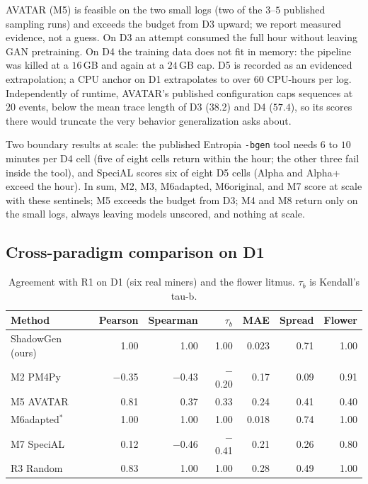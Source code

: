 \documentclass[runningheads]{llncs}
\newcommand{\chg}[1]{\textcolor{chgblue}{#1}}
\begin{document}
\chg{AVATAR (M5) is feasible on the two small logs (two of the $3$--$5$ published sampling runs) and exceeds the budget from D3 upward; we report measured evidence, not a guess. On D3 an attempt consumed the full hour without leaving GAN pretraining. On D4 the training data does not fit in memory: the pipeline was killed at a $16$\,GB and again at a $24$\,GB cap. D5 is recorded as an evidenced extrapolation; a CPU anchor on D1 extrapolates to over $60$ CPU-hours per log. Independently of runtime, AVATAR's published configuration caps sequences at $20$ events, below the mean trace length of D3 ($38.2$) and D4 ($57.4$), so its scores there would truncate the very behavior generalization asks about.}

\chg{Two boundary results at scale: the published Entropia \texttt{-bgen} tool needs $6$ to $10$ minutes per D4 cell (five of eight cells return within the hour; the other three fail inside the tool), and SpeciAL scores six of eight D5 cells (Alpha and Alpha+ exceed the hour). In sum, M2, M3, M6adapted, M6original, and M7 score at scale with these sentinels; M5 exceeds the budget from D3; M4 and M8 return only on the small logs, always leaving models unscored, and nothing at scale.}

\subsection{Cross-paradigm comparison on D1}
\label{sec:eval:external}


\begin{table}[t]
\centering
\caption{Agreement with R1 on D1 (six real miners) and the flower litmus. $\tau_b$ is Kendall's tau-b.}
\label{tab:corr}
\setlength{\tabcolsep}{4.5pt}
\footnotesize
\begin{tabular}{@{}lrrrrrr@{}}
\toprule
Method & Pearson & Spearman & $\tau_b$ & MAE & Spread & Flower \\
\midrule
\chg{ShadowGen (ours)}  & 1.00 & 1.00 & 1.00 & 0.023 & 0.71 & 1.00 \\
M2 PM4Py         & $-$0.35 & $-$0.43 & $-$0.20 & 0.17 & 0.09 & 0.91 \\
M5 AVATAR        & 0.81 & 0.37 & 0.33 & 0.24 & 0.41 & 0.40 \\
M6adapted$^{*}$ & 1.00 & 1.00 & 1.00 & 0.018 & 0.74 & 1.00 \\
M7 SpeciAL       & 0.12 & $-$0.46 & $-$0.41 & 0.21 & 0.26 & 0.80 \\
R3 Random        & 0.83 & 1.00 & 1.00 & 0.28 & 0.49 & 1.00 \\
\bottomrule
\end{tabular}
\end{table}
\end{document}
